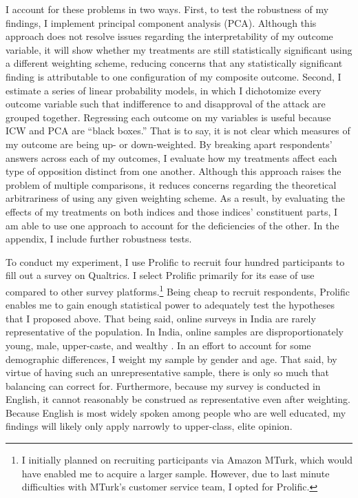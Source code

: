 \documentclass[12pt]{article}
\begin{document}
I account for these problems in two ways. First, to test the robustness of my findings, I implement principal component analysis (PCA). Although this approach does not resolve issues regarding the interpretability of my outcome variable, it will show whether my treatments are still statistically significant using a different weighting scheme, reducing concerns that any statistically significant finding is attributable to one configuration of my composite outcome. Second, I estimate a series of linear probability models, in which I dichotomize every outcome variable such that indifference to and disapproval of the attack are grouped together. Regressing each outcome on my variables is useful because ICW and PCA are “black boxes.” That is to say, it is not clear which measures of my outcome are being up- or down-weighted. By breaking apart respondents' answers across each of my outcomes, I evaluate how my treatments affect each type of opposition distinct from one another. Although this approach raises the problem of multiple comparisons, it reduces concerns regarding the theoretical arbitrariness of using any given weighting scheme. As a result, by evaluating the effects of my treatments on both indices and those indices' constituent parts, I am able to use one approach to account for the deficiencies of the other. In the appendix, I include further robustness tests.

To conduct my experiment, I use Prolific to recruit four hundred participants to fill out a survey on Qualtrics. I select Prolific primarily for its ease of use compared to other survey platforms.\footnote{I initially planned on recruiting participants via Amazon MTurk, which would have enabled me to acquire a larger sample. However, due to last minute difficulties with MTurk's customer service team, I opted for Prolific.} Being cheap to recruit respondents, Prolific enables me to gain enough statistical power to adequately test the hypotheses that I proposed above. That being said, online surveys in India are rarely representative of the population. In India, online samples are disproportionately young, male, upper-caste, and wealthy \citep{boas_recruiting_2020}. In an effort to account for some demographic differences, I weight my sample by gender and age. That said, by virtue of having such an unrepresentative sample, there is only so much that balancing can correct for. Furthermore, because my survey is conducted in English, it cannot reasonably be construed as representative even after weighting. Because English is most widely spoken among people who are well educated, my findings will likely only apply narrowly to upper-class, elite opinion. 
\end{document}
